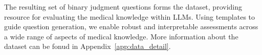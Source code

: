 The resulting set of binary judgment questions forms the \mkj{} dataset, providing resource for evaluating the medical knowledge within LLMs. Using templates to guide question generation, we enable robust and interpretable assessments across a wide range of aspects of medical knowledge. More information about the dataset can be fonud in Appendix~\ref{app:data_detail}.


